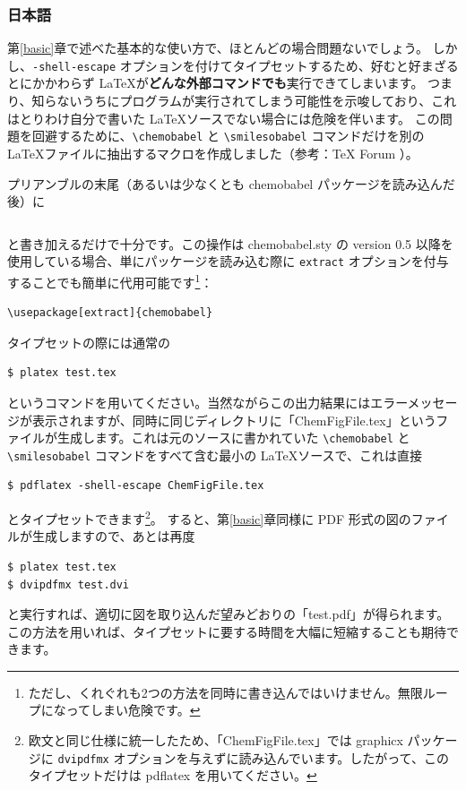 \documentclass[12pt]{jsarticle}
\begin{document}
\clearpage

\subsubsection{日本語}

第\ref{basic}章で述べた基本的な使い方で、ほとんどの場合問題ないでしょう。
しかし、\verb|-shell-escape| オプションを付けてタイプセットするため、好むと好まざるとにかかわらず \LaTeX が\textbf{どんな外部コマンドでも}実行できてしまいます。
つまり、知らないうちにプログラムが実行されてしまう可能性を示唆しており、これはとりわけ自分で書いた \LaTeX ソースでない場合には危険を伴います。
この問題を回避するために、\verb|\chemobabel| と \verb|\smilesobabel| コマンドだけを別の \LaTeX ファイルに抽出するマクロを作成しました（参考：{\TeX} Forum \cite{OKU}）。

プリアンブルの末尾（あるいは少なくとも \textsf{chemobabel} パッケージを読み込んだ後）に
\begin{verbatim}

\end{verbatim}
と書き加えるだけで十分です。この操作は \textsf{chemobabel.sty} の version 0.5 以降を使用している場合、単にパッケージを読み込む際に \verb|extract| オプションを付与することでも簡単に代用可能です\footnote{ただし、くれぐれも2つの方法を同時に書き込んではいけません。無限ループになってしまい危険です。}：
\begin{verbatim}
\usepackage[extract]{chemobabel}
\end{verbatim}
タイプセットの際には通常の
\begin{verbatim}
$ platex test.tex
\end{verbatim}
というコマンドを用いてください。当然ながらこの出力結果にはエラーメッセージが表示されますが、同時に同じディレクトリに「ChemFigFile.tex」というファイルが生成します。これは元のソースに書かれていた \verb|\chemobabel| と \verb|\smilesobabel| コマンドをすべて含む最小の \LaTeX ソースで、これは直接
\begin{verbatim}
$ pdflatex -shell-escape ChemFigFile.tex
\end{verbatim}
とタイプセットできます\footnote{欧文と同じ仕様に統一したため、「ChemFigFile.tex」では \textsf{graphicx} パッケージに \texttt{dvipdfmx} オプションを与えずに読み込んでいます。したがって、このタイプセットだけは pdflatex を用いてください。}。
すると、第\ref{basic}章同様に PDF 形式の図のファイルが生成しますので、あとは再度
\begin{verbatim}
$ platex test.tex
$ dvipdfmx test.dvi
\end{verbatim}
と実行すれば、適切に図を取り込んだ望みどおりの「test.pdf」が得られます。
この方法を用いれば、タイプセットに要する時間を大幅に短縮することも期待できます。
\end{document}
